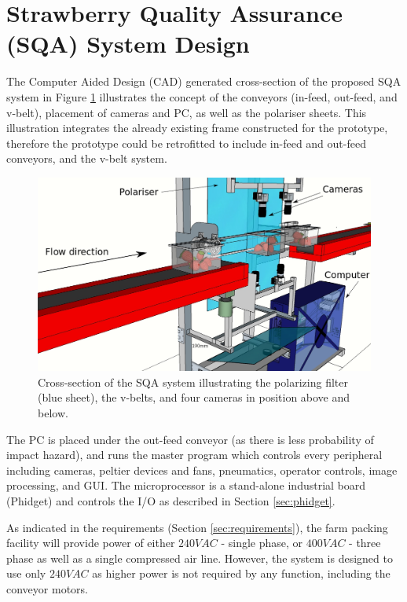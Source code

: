 \documentclass[fleqn,twoside,12pt]{report}
\begin{document}
\section{Strawberry Quality Assurance (SQA) System Design}


The Computer Aided Design (CAD) generated cross-section of the proposed SQA system in Figure \ref{fig:cross_sec} illustrates the concept of the conveyors (in-feed, out-feed, and v-belt), placement of cameras and PC, as well as the polariser sheets. This illustration integrates the already existing frame constructed for the prototype, therefore the prototype could be retrofitted to include in-feed and out-feed conveyors, and the v-belt system.  



\begin{figure}[h]
	\centering
	\includegraphics[width=.8\linewidth]{QAS_cross_sec.png}
	\caption{Cross-section of the SQA system illustrating the polarizing filter (blue sheet), the v-belts, and four cameras in position above and below.}
	\label{fig:cross_sec}
\end{figure}%



The PC is placed under the out-feed conveyor (as there is less probability of impact hazard), and runs the master program which controls every peripheral including cameras, peltier devices and fans, pneumatics, operator controls, image processing, and GUI. The microprocessor is a stand-alone industrial board (Phidget\texttrademark) and controls the I/O as described in Section \ref{sec:phidget}.

As indicated in the requirements (Section \ref{sec:requirements}), the farm packing facility will provide power of either $240VAC$ - single phase, or $400VAC$ - three phase as well as a single compressed air line. However, the system is designed to use only $240VAC$ as higher power is not required by any function, including the conveyor motors.
\end{document}
